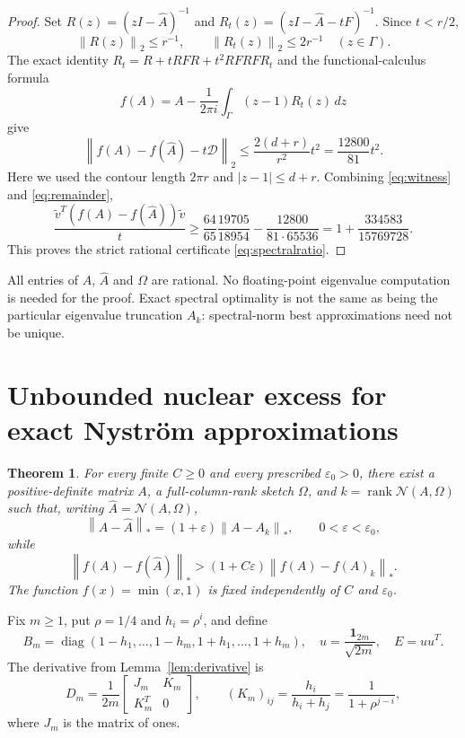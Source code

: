 \documentclass[11pt]{article}
\newtheorem{theorem}{Theorem}[section]
\theoremstyle{definition}
\newcommand{\rank}{\operatorname{rank}}
\newcommand{\diag}{\operatorname{diag}}
\newcommand{\norm}[1]{\left\lVert#1\right\rVert}
\newcommand{\eps}{\varepsilon}
\begin{document}
\begin{proof}
Set $R(z)=(zI-\widehat A)^{-1}$ and $R_t(z)=(zI-\widehat A-tF)^{-1}$. Since $t<r/2$,
\[
 \norm{R(z)}_2\le r^{-1},\qquad
 \norm{R_t(z)}_2\le2r^{-1}\quad(z\in\Gamma).
\]
The exact identity $R_t=R+tRFR+t^2RFRFR_t$ and the functional-calculus formula
\[
 f(A)=A-\frac1{2\pi i}\int_\Gamma(z-1)R_t(z)\,dz
\]
give
\begin{equation}\label{eq:remainder}
 \norm{f(A)-f(\widehat A)-t\mathcal D}_2
 \le\frac{2(d+r)}{r^2}t^2=\frac{12800}{81}t^2.
\end{equation}
Here we used the contour length $2\pi r$ and $|z-1|\le d+r$. Combining \eqref{eq:witness} and \eqref{eq:remainder},
\[
 \frac{\widetilde v^T(f(A)-f(\widehat A))\widetilde v}{t}
 \ge\frac{64}{65}\frac{19705}{18954}
       -\frac{12800}{81\cdot65536}
 =1+\frac{334583}{15769728}.
\]
This proves the strict rational certificate \eqref{eq:spectralratio}.
\end{proof}

All entries of $A$, $\widehat A$ and $\Omega$ are rational. No floating-point eigenvalue computation is needed for the proof. Exact spectral optimality is not the same as being the particular eigenvalue truncation $A_k$: spectral-norm best approximations need not be unique.

\section{Unbounded nuclear excess for exact Nystr\"om approximations}
\begin{theorem}\label{thm:nuclear}
For every finite $C\ge0$ and every prescribed $\eps_0>0$, there exist a positive-definite matrix $A$, a full-column-rank sketch $\Omega$, and $k=\rank\mathcal N(A,\Omega)$ such that, writing $\widehat A=\mathcal N(A,\Omega)$,
\[
 \norm{A-\widehat A}_*=(1+\eps)\norm{A-A_k}_*,
 \qquad 0<\eps<\eps_0,
\]
while
\[
 \norm{f(A)-f(\widehat A)}_*>(1+C\eps)\norm{f(A)-f(A)_k}_*.
\]
The function $f(x)=\min(x,1)$ is fixed independently of $C$ and $\eps_0$.
\end{theorem}

Fix $m\ge1$, put $\rho=1/4$ and $h_i=\rho^i$, and define
\[
 B_m=\diag(1-h_1,\ldots,1-h_m,1+h_1,\ldots,1+h_m),
 \quad u=\frac{\boldsymbol1_{2m}}{\sqrt{2m}},\quad E=uu^T.
\]
The derivative from Lemma~\ref{lem:derivative} is
\begin{equation}\label{eq:Dm}
 D_m=\frac1{2m}\begin{bmatrix}J_m&K_m\\K_m^T&0\end{bmatrix},
 \qquad (K_m)_{ij}=\frac{h_i}{h_i+h_j}
                  =\frac1{1+\rho^{j-i}},
\end{equation}
where $J_m$ is the matrix of ones.
\end{document}
